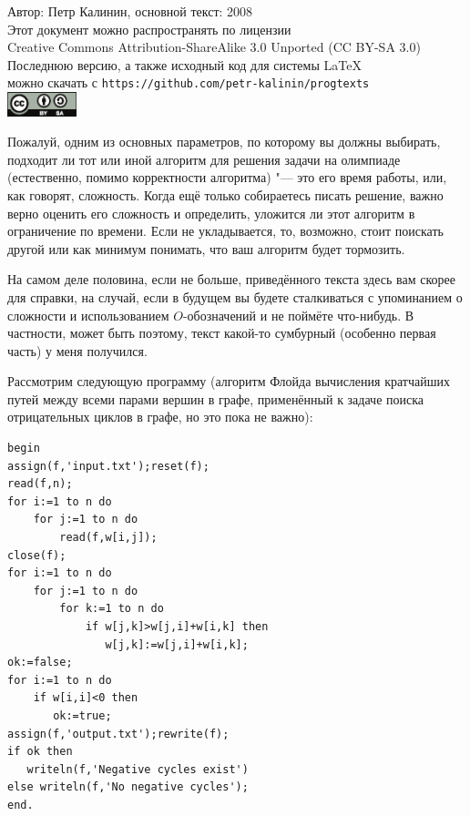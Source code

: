 \documentclass[a4paper,10pt]{problems}
\begin{document}

\begin{flushright}
Автор: Петр Калинин, основной текст: 2008\\
Этот документ можно распространять по лицензии\\
Creative Commons Attribution-ShareAlike 3.0 Unported (CC BY-SA 3.0)\\
Последнюю версию, а также исходный код для системы \LaTeX\\
можно скачать с \verb`https://github.com/petr-kalinin/progtexts`\\
\includegraphics[width=2cm]{by-sa-corr.eps}
\end{flushright}

Пожалуй, одним из основных параметров, по которому вы должны выбирать, подходит 
ли тот или иной алгоритм для решения задачи на олимпиаде (естественно, помимо 
корректности алгоритма) "--- это его время работы, или, как говорят, сложность. 
Когда ещё только собираетесь писать решение, важно верно оценить его сложность 
и определить, уложится ли этот алгоритм в ограничение по времени. Если не 
укладывается, то, возможно, стоит поискать другой или как минимум понимать, что 
ваш алгоритм будет тормозить.

На самом деле половина, если не больше, приведённого текста здесь вам скорее 
для справки, на случай, если в будущем вы будете сталкиваться с упоминанием о сложности и 
использованием $O$-обозначений и не поймёте что-нибудь. В частности, может быть 
поэтому, текст какой-то сумбурный (особенно первая часть) у меня получился.


Рассмотрим следующую программу (алгоритм Флойда вычисления кратчайших путей 
между всеми парами вершин в графе, применённый к задаче поиска отрицательных 
циклов в графе, но это пока не важно):
\begin{codesample}\begin{verbatim}
begin
assign(f,'input.txt');reset(f);
read(f,n);
for i:=1 to n do
    for j:=1 to n do
        read(f,w[i,j]);
close(f);
for i:=1 to n do
    for j:=1 to n do
        for k:=1 to n do
            if w[j,k]>w[j,i]+w[i,k] then
               w[j,k]:=w[j,i]+w[i,k];
ok:=false;
for i:=1 to n do
    if w[i,i]<0 then
       ok:=true;
assign(f,'output.txt');rewrite(f);
if ok then
   writeln(f,'Negative cycles exist')
else writeln(f,'No negative cycles');
end.
\end{verbatim}\end{codesample}
\end{document}
